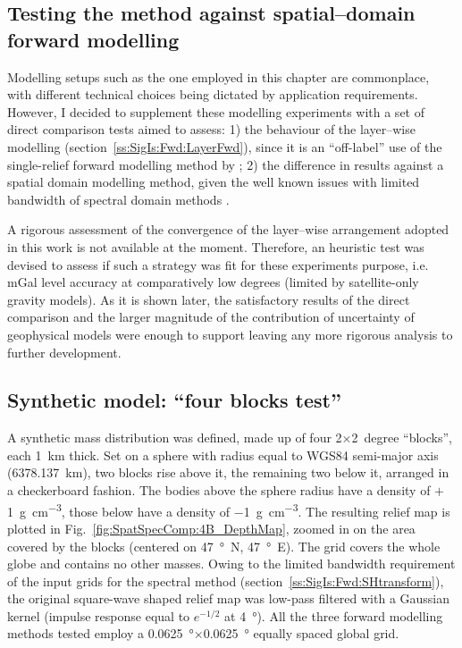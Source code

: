 \cleardoublepage
\begin{subappendices}
\section[Testing the method against spatial--domain forward modelling]{Testing the method against spatial--domain forward modelling}
\label{s:SigIs:Test}

Modelling setups such as the one employed in this chapter are commonplace, with different technical choices being dictated by application requirements.
However, I decided to supplement these modelling experiments with a set of direct comparison tests aimed to assess:
1) the behaviour of the layer--wise modelling (section~\ref{ss:SigIs:Fwd:LayerFwd}), since it is an ``off-label'' use of the single-relief forward modelling method by \textcite{Wieczorek2007};
2) the difference in results against a spatial domain modelling method, given the well known issues with limited bandwidth of spectral domain methods \parencite{Hirt2014}.

A rigorous assessment of the convergence of the layer--wise arrangement adopted in this work is not available at the moment.
Therefore, an heuristic test was devised to assess if such a strategy was fit for these experiments purpose, i.e. \si{\milli Gal} level accuracy at comparatively low degrees (limited by satellite-only gravity models).
As it is shown later, the satisfactory results of the direct comparison and the larger magnitude of the contribution of uncertainty of geophysical models were enough to support leaving any more rigorous analysis to further development.

\subsection{Synthetic model: ``four blocks test''}
\label{ss:SigIs:Test:FourBlocks}

A synthetic mass distribution was defined, made up of four 2$\times$2~degree ``blocks'', each \SI{1}{\kilo \metre} thick.
Set on a sphere with radius equal to WGS84 semi-major axis (\SI{6378.137}{\kilo \metre}), two blocks rise above it, the remaining two below it, arranged in a checkerboard fashion.
The bodies above the sphere radius have a density of $+$\SI{1}{\gram \per \cubic \centi \metre}, those below have a density of \SI{-1}{\gram \per \cubic \centi \metre}.
The resulting relief map is plotted in Fig.~\ref{fig:SpatSpecComp:4B_DepthMap}, zoomed in on the area covered by the blocks (centered on \SI{47}{\degree N}, \SI{47}{\degree E}).
The grid covers the whole globe and contains no other masses.
Owing to the limited bandwidth requirement of the input grids for the spectral method (section~\ref{ss:SigIs:Fwd:SHtransform}), the original square-wave shaped relief map was low-pass filtered with a Gaussian kernel (impulse response equal to $e^{-1/2}$ at \SI{4}{\degree}).
All the three forward modelling methods tested employ a \SI{0.0625}{\degree}$\times$\SI{0.0625}{\degree} equally spaced global grid.


\end{subappendices}
